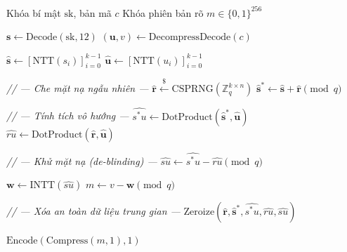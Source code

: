 \documentclass[../LuanVan.tex]{subfiles}
\begin{document}
\begin{algorithm}[H]
\caption{Giải mã Kyber với cơ chế che mặt nạ ngẫu nhiên $\mathbf{r}$}
\label{alg:decrypt_blinded}
\begin{algorithmic}[1]
\Require Khóa bí mật $\mathrm{sk}$, bản mã $c$
\Ensure Khóa phiên bản rõ $m \in \{0,1\}^{256}$

\State $\mathbf{s} \gets \mathrm{Decode}(\mathrm{sk}, 12)$
\State $(\mathbf{u}, v) \gets \mathrm{DecompressDecode}(c)$

\State $\hat{\mathbf{s}} \gets [\mathrm{NTT}(s_i)]_{i=0}^{k-1}$
\State $\hat{\mathbf{u}} \gets [\mathrm{NTT}(u_i)]_{i=0}^{k-1}$

\State \textit{// --- Che mặt nạ ngẫu nhiên ---}
\State $\hat{\mathbf{r}} \xleftarrow{\$} \mathrm{CSPRNG}(\mathbb{Z}_q^{k \times n})$
\State $\hat{\mathbf{s}}^{*} \gets \hat{\mathbf{s}} + \hat{\mathbf{r}} \pmod q$

\State \textit{// --- Tính tích vô hướng ---}
\State $\widehat{s^{*}u} \gets \mathrm{DotProduct}(\hat{\mathbf{s}}^{*}, \hat{\mathbf{u}})$
\State $\widehat{ru} \gets \mathrm{DotProduct}(\hat{\mathbf{r}}, \hat{\mathbf{u}})$

\State \textit{// --- Khử mặt nạ (de-blinding) ---}
\State $\widehat{su} \gets \widehat{s^{*}u} - \widehat{ru} \pmod q$

\State $\mathbf{w} \gets \mathrm{INTT}(\widehat{su})$
\State $m \gets v - \mathbf{w} \pmod q$

\State \textit{// --- Xóa an toàn dữ liệu trung gian ---}
\State $\mathrm{Zeroize}(\hat{\mathbf{r}}, \hat{\mathbf{s}}^{*}, \widehat{s^{*}u}, \widehat{ru}, \widehat{su})$

\State \Return $\mathrm{Encode}(\mathrm{Compress}(m, 1), 1)$
\end{algorithmic}
\end{algorithm}
\end{document}
